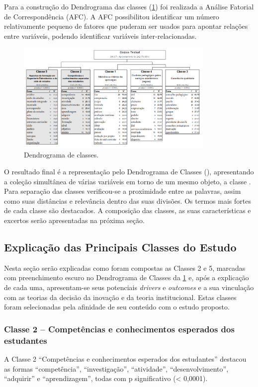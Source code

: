 \documentclass{textolivre-html}
\begin{document}
Para a construção do Dendrograma das classes (\cref{Fig02}) foi realizada a Análise Fatorial de Correspondência (AFC). A AFC possibilitou identificar um número relativamente pequeno de fatores que puderam ser usados para apontar relações entre variáveis, podendo identificar variáveis inter-relacionadas.

\begin{figure}[htbp]
 \centering
 \includegraphics[width=0.85\textwidth]{Fig02.png}
 \caption{Dendrograma de classes.}
 \label{Fig02}
\end{figure}

O resultado final é a representação pelo Dendrograma de Classes (), apresentando a coleção simultânea de várias variáveis em torno de um mesmo objeto, a classe \cite{lebart1994}. Para separação das classes verificou-se a proximidade entre as palavras, assim como suas distâncias e relevância dentro das suas divisões. Os termos mais fortes de cada classe são destacados. A composição das classes, as suas características e excertos serão apresentadas na próxima seção.

\subsection{Explicação das Principais Classes do Estudo}\label{sec-explicacao}
Nesta seção serão explicadas como foram compostas as Classes 2 e 5, marcadas com preenchimento escuro no Dendrograma de Classes da \cref{Fig02} e, após a explicação de cada uma, apresentam-se seus potenciais \textit{drivers} e \textit{outcomes} e a sua vinculação com as teorias da decisão da inovação e da teoria institucional. Estas classes foram selecionadas pela afinidade de seu conteúdo com o estudo proposto.

\subsubsection{Classe 2 – Competências e conhecimentos esperados dos estudantes}\label{sec-classe}
A Classe 2 “Competências e conhecimentos esperados dos estudantes” destacou as formas “competência”, “investigação”, “atividade”, “desenvolvimento”, “adquirir” e “aprendizagem”, todas com p significativo (< 0,0001).
\end{document}
